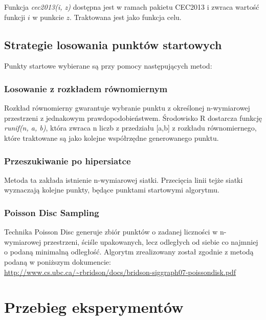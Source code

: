 \documentclass{article}
\begin{document}
Funkcja \textit{cec2013(i, z)} dostępna jest w ramach pakietu CEC2013 i zwraca wartość funkcji $i$ w punkcie $z$. Traktowana jest jako funkcja celu.


\subsection{Strategie losowania punktów startowych}
Punkty startowe wybierane są przy pomocy następujących metod:

\subsubsection{Losowanie z rozkładem równomiernym}
Rozkład równomierny gwarantuje wybranie punktu z określonej n-wymiarowej przestrzeni z jednakowym prawdopodobieństwem. Środowisko R dostarcza funkcję \textit{runif(n, a, b)}, która zwraca n liczb z przedziału [a,b] z rozkładu równomiernego, które traktowane są jako kolejne współrzędne generowanego punktu.

\subsubsection{Przeszukiwanie po hipersiatce}
Metoda ta zakłada istnienie n-wymiarowej siatki. Przecięcia linii tejże siatki wyznaczają kolejne punkty, będące punktami startowymi algorytmu.

\subsubsection{Poisson Disc Sampling}
Technika Poisson Disc generuje zbiór punktów o zadanej liczności w n-wymiarowej przestrzeni, ściśle upakowanych, lecz odległych od siebie co najmniej o podaną minimalną odległość. Algorytm zrealizowany został zgodnie z metodą podaną w poniższym dokumencie:\\
\url{http://www.cs.ubc.ca/~rbridson/docs/bridson-siggraph07-poissondisk.pdf}

\section{Przebieg eksperymentów}
\end{document}

